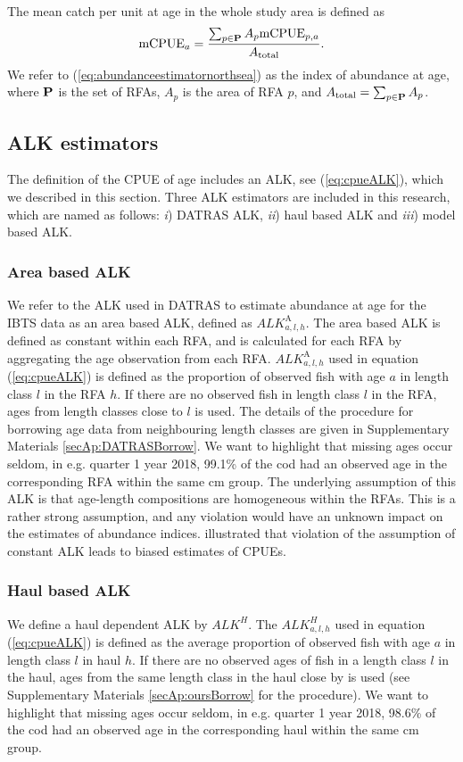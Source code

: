 \documentclass[a4paper 12pt]{article}
\numberwithin{equation}{section}
\begin{document}
 The mean catch per unit at age in the whole study area is defined as
\begin{equation}
\text{mCPUE}_a= \frac{\sum_{p\in {\bf P}} A_{p}  \mathrm{mCPUE}_{p,a}}{A_{\text{total}}}.
\label{eq:abundanceestimatornorthsea}
\end{equation}
We refer to (\ref{eq:abundanceestimatornorthsea}) as the index of abundance at age, where ${\bf P}$ is the set of RFAs, $A_p$ is the area of RFA $p$, and $A_{\text{total}} = \sum_{p\in {\bf P}} A_{p}$.
\subsection{ALK estimators}
\label{sec:alkmethods}
The definition of the CPUE of age includes an ALK, see (\ref{eq:cpueALK}), which we described in this section. Three ALK estimators are included in this research, which are named as follows:  \textit{i}) DATRAS ALK, \textit{ii}) haul based ALK and \textit{iii}) model based ALK.
\subsubsection{Area based ALK}
\label{sec:datrasalkestimator}

We refer to the ALK used in DATRAS to estimate abundance at age for the IBTS data as an area based ALK, defined as $ALK^{\text{A}}_{a,l,h}$. The area based ALK is defined as constant within each RFA, and is calculated for each RFA by aggregating the age observation from each RFA. $ALK^{\text{A}}_{a,l,h}$ used in equation (\ref{eq:cpueALK}) is defined as the proportion of observed fish with age $a$ in length class $l$ in the RFA $h$. If there are no observed fish in length class $l$ in the RFA, ages from length classes close to $l$ is used. The details of the procedure for borrowing age data from neighbouring length classes are given in Supplementary Materials \ref{secAp:DATRASBorrow}. We want to highlight that missing ages occur seldom, in e.g. quarter 1 year 2018, 99.1\% of the cod had an observed age in the corresponding RFA within the same cm group.  The underlying assumption of this ALK  is that age-length compositions are homogeneous within the RFAs. This is a rather strong assumption, and any violation would have an unknown impact on the estimates of abundance indices. \citet{aanes2015efficient} illustrated that violation of the assumption of constant ALK leads to biased estimates of CPUEs. 


\subsubsection{Haul based ALK}
\label{sec:haulestimator}
We define a haul dependent ALK  by  $ALK^{H}$. The $ALK^{H}_{a,l,h}$  used in equation (\ref{eq:cpueALK}) is defined as the average proportion of observed fish with age $a$ in  length class $l$ in haul $h$. If there are no observed ages of fish in a length class $l$ in the haul, ages from the same length class in the haul close by is used (see Supplementary Materials \ref{secAp:oursBorrow} for the procedure). We want to highlight that missing ages occur seldom, in e.g. quarter 1 year 2018, 98.6\% of the cod had an observed age in the corresponding haul within the same cm group. 
\end{document}
